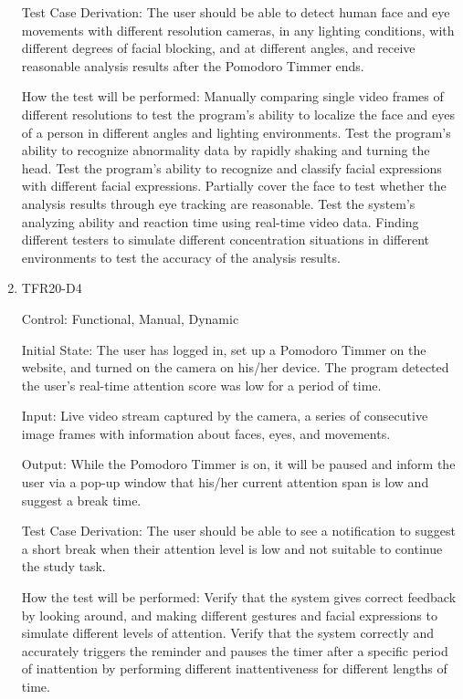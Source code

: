\documentclass[12pt, titlepage]{article}
\begin{document}
\begin{enumerate}
  Test Case Derivation: The user should be able to detect human face and eye movements with different resolution cameras, in any lighting conditions, with different degrees of facial blocking, and at different angles, and receive reasonable analysis results after the Pomodoro Timmer ends. 
            
  How the test will be performed: Manually comparing single video frames of different resolutions to test the program's ability to localize the face and eyes of a person in different angles and lighting environments. Test the program's ability to recognize abnormality data by rapidly shaking and turning the head. Test the program's ability to recognize and classify facial expressions with different facial expressions. Partially cover the face to test whether the analysis results through eye tracking are reasonable. Test the system's analyzing ability and reaction time using real-time video data. Finding different testers to simulate different concentration situations in different environments to test the accuracy of the analysis results.

  \item{TFR20-D4\\}

Control: Functional, Manual, Dynamic
					
Initial State: The user has logged in, set up a Pomodoro Timmer on the website, and turned on the camera on his/her device. The program detected the user's real-time attention score was low for a period of time.
					
Input: Live video stream captured by the camera, a series of consecutive image frames with information about faces, eyes, and movements.
					
Output: While the Pomodoro Timmer is on, it will be paused and inform the user via a pop-up window that his/her current attention span is low and suggest a break time.

Test Case Derivation: The user should be able to see a notification to suggest a short break when their attention level is low and not suitable to continue the study task.
					
How the test will be performed: Verify that the system gives correct feedback by looking around, and making different gestures and facial expressions to simulate different levels of attention. Verify that the system correctly and accurately triggers the reminder and pauses the timer after a specific period of inattention by performing different inattentiveness for different lengths of time.


\end{enumerate}
\end{document}
